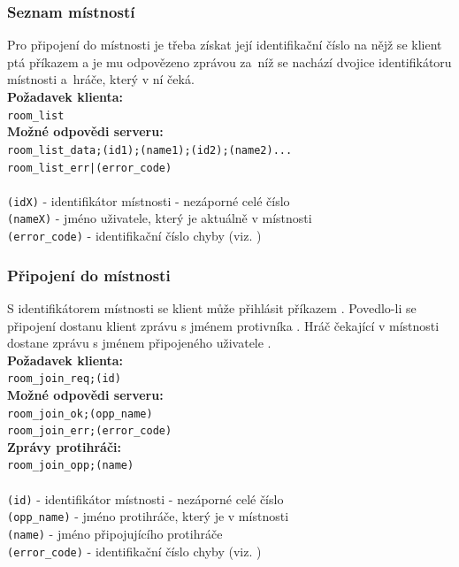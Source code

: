 \documentclass[12pt, a4paper]{article} %
\begin{document}
	\subsubsection{Seznam místností}
	\par Pro připojení do místnosti je třeba získat její identifikační číslo na nějž se klient ptá příkazem  a je mu odpovězeno zprávou  za níž se nachází dvojice identifikátoru místnosti a hráče, který v ní čeká.\\	
	\textbf{Požadavek klienta:}\\
	\texttt{room\_list}\\
	\textbf{Možné odpovědi serveru:}\\
	\texttt{room\_list\_data;(id1);(name1);(id2);(name2)...}\\
	\texttt{room\_list\_err|(error\_code)}\\\\
	\texttt{(idX)} - identifikátor místnosti - nezáporné celé číslo\\
	\texttt{(nameX)} - jméno uživatele, který je aktuálně v místnosti\\
	\texttt{(error\_code)} - identifikační číslo chyby (viz. )
	\subsubsection{Připojení do místnosti}
	\par S identifikátorem místnosti se klient může přihlásit příkazem . Povedlo-li se připojení dostanu klient zprávu s jménem protivníka .  Hráč čekající v místnosti dostane zprávu s jménem připojeného uživatele .\\	
	\textbf{Požadavek klienta:}\\
	\texttt{room\_join\_req;(id)}\\
	\textbf{Možné odpovědi serveru:}\\
	\texttt{room\_join\_ok;(opp\_name)}\\
	\texttt{room\_join\_err;(error\_code)}\\
	\textbf{Zprávy protihráči:}\\
	\texttt{room\_join\_opp;(name)}\\\\
	\texttt{(id)} - identifikátor místnosti - nezáporné celé číslo\\
	\texttt{(opp\_name)} - jméno protihráče, který je v místnosti\\
	\texttt{(name)} - jméno připojujícího protihráče\\
	\texttt{(error\_code)} - identifikační číslo chyby (viz. )
\end{document}

